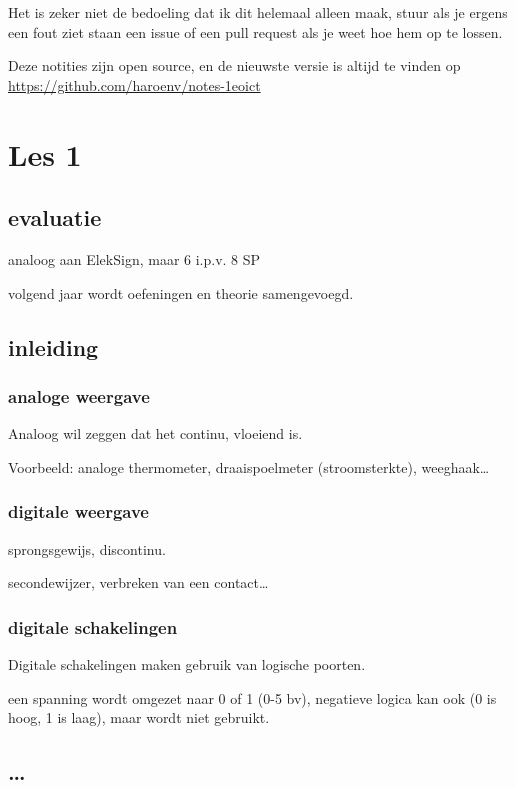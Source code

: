 \documentclass[11pt, a4paper]{article}
\begin{document}
Het is zeker niet de bedoeling dat ik dit helemaal alleen maak, stuur als je ergens een fout ziet staan een issue of een pull request als je weet hoe hem op te lossen.

Deze notities zijn open source, en de nieuwste versie is altijd te vinden op \url{https://github.com/haroenv/notes-1eoict}

\section{Les 1}

\subsection{evaluatie}

analoog aan ElekSign, maar 6 i.p.v. 8 SP

volgend jaar wordt oefeningen en theorie samengevoegd.

\subsection{inleiding}

\subsubsection{analoge weergave}

Analoog wil zeggen dat het continu, vloeiend is.

Voorbeeld: analoge thermometer, draaispoelmeter (stroomsterkte), weeghaak\dots

\subsubsection{digitale weergave}

sprongsgewijs, discontinu.

secondewijzer, verbreken van een contact\dots

\subsubsection{digitale schakelingen}

Digitale schakelingen maken gebruik van logische poorten.

een spanning wordt omgezet naar 0 of 1 (0-5 bv), negatieve logica kan ook (0 is hoog, 1 is laag), maar wordt niet gebruikt.

\subsection{\dots}
\end{document}
